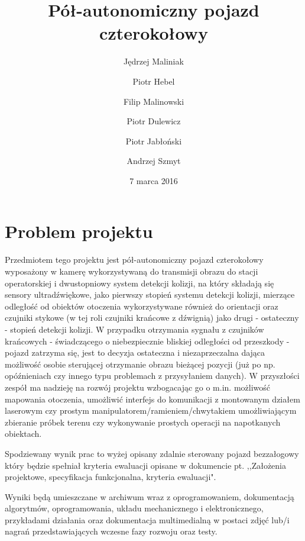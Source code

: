 \documentclass[a4paper]{article}
\title{Pół-autonomiczny pojazd czterokołowy}
\author{Jędrzej Maliniak \and Piotr Hebel \and Filip Malinowski \and Piotr Dulewicz \and Piotr Jabłoński \and Andrzej Szmyt}
\date{7 marca 2016}
\begin{document}
\maketitle

\section{Problem projektu}
    Przedmiotem tego projektu jest pół-autonomiczny pojazd czterokołowy wyposażony w kamerę wykorzystywaną do transmisji obrazu do stacji operatorskiej i dwustopniowy system detekcji kolizji, na który składają się sensory ultradźwiękowe, jako pierwszy stopień systemu detekcji kolizji, mierzące odległość od obiektów otoczenia wykorzystywane również do orientacji oraz czujniki stykowe (w tej roli czujniki krańcowe z dźwignią) jako drugi - ostateczny - stopień  detekcji kolizji. W przypadku otrzymania sygnału z czujników krańcowych - świadczącego o niebezpiecznie bliskiej odległości od przeszkody - pojazd zatrzyma się, jest to decyzja ostateczna i niezaprzeczalna dająca możliwość osobie sterującej otrzymanie obrazu bieżącej pozycji (już po np. opóźnieniach czy innego typu problemach z przysyłaniem danych). W przyszłości zespół ma nadzieję na rozwój projektu wzbogacając go o m.in. możliwość mapowania otoczenia, umożliwić interfejs do komunikacji z montowanym działem laserowym czy prostym manipulatorem/ramieniem/chwytakiem umożliwiającym zbieranie próbek terenu czy wykonywanie prostych operacji na napotkanych obiektach.
    
    Spodziewany wynik prac to wyżej opisany zdalnie sterowany pojazd bezzałogowy który będzie spełniał kryteria ewaluacji opisane w dokumencie pt. ,,Założenia projektowe, specyfikacja funkcjonalna, kryteria ewaluacji".

    Wyniki będą umieszczane w archiwum wraz z oprogramowaniem, dokumentacją algorytmów, oprogramowania, układu mechanicznego i elektronicznego, przykładami działania oraz dokumentacja multimedialną w postaci zdjęć lub/i nagrań przedstawiających wczesne fazy rozwoju oraz testy.
\end{document}
